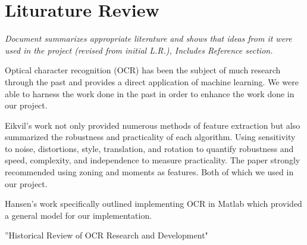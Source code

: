 \section{Liturature Review}
\textit{Document summarizes appropriate literature and shows that ideas from it were used in the project (revised from initial L.R.), Includes Reference section. 
}

Optical character recognition (OCR) has been the subject of much research through the past and provides a direct application of machine learning. We were able to harness the work done in the past in order to enhance the work done in our project. 

Eikvil's work \cite{one} not only provided numerous methods of feature extraction but also summarized the robustness and practicality of each algorithm. Using sensitivity to noise, distortions, style, translation, and rotation to quantify robustness and speed, complexity, and independence to measure practicality. The paper strongly recommended using zoning and moments as features. Both of which we used in our project.

Hansen's work \cite{two} specifically outlined implementing OCR in Matlab which provided a general model for our implementation.

''Historical Review of OCR Research and Development" \cite{three} 